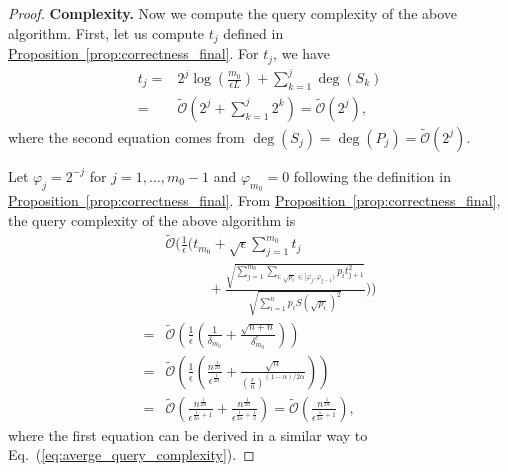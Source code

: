 \documentclass[journal]{IEEEtran}
\newcommand{\eq}[1]{Eq.~(\ref{eq:#1})}
\newcommand{\prop}[1]{\hyperref[prop:#1]{Proposition~\ref*{prop:#1}}}
\begin{document}
\begin{proof}
    \vspace{3mm}
    \noindent
    \textbf{Complexity.}
    Now we compute the query complexity of the above algorithm. 
    First, let us compute $t_j$ defined in \prop{correctness_final}. For $t_j$, we have
    \begin{align}
        t_j = & 2^j\log(\frac{m_0}{\epsilon L}) + \sum_{k = 1}^{j}\deg(S_k) \nonumber \\
        = & \widetilde{\mathcal{O}}\left(2^j + \sum_{k = 1}^{j} 2^k\right)= \widetilde{\mathcal{O}}\left(2^j\right),
    \end{align}
    where the second equation comes from $\deg(S_j) =
    \deg(P_j) = \widetilde{\mathcal{O}}\left(2^j\right)$. 

    Let $\varphi_j = 2^{-j}$ for $j = 1,\ldots,m_0-1$ and $\varphi_{m_0}=0$ following the definition in \prop{correctness_final}.
    From \prop{correctness_final}, the query complexity of the above algorithm is 
    \begin{align}
    &\widetilde{\mathcal{O}}\biggl(\frac{1}{\epsilon}\biggl(t_{m_0} + \sqrt{\epsilon} \sum_{j=1}^{m_0} t_j \nonumber \\ 
    & \qquad \quad+ \frac{\sqrt{\sum_{j = 1}^{m_0}\sum_{i:\sqrt{p_i}\in[\varphi_{j},\varphi_{j-1})}p_i t_{j+1}^2}}{\sqrt{\sum_{i = 1}^np_iS(\sqrt{p_i})^2}}\biggr)\biggr) \nonumber\\
    =&\widetilde{\mathcal{O}}\left(\frac{1}{\epsilon}\left(\frac{1}{\delta_{m_0}} + \frac{\sqrt{n + n}}{\delta_{m_0}^{c}}\right)\right) \nonumber\\
    =&\widetilde{\mathcal{O}}\left(\frac{1}{\epsilon}\left(\frac{n^{\frac{1}{2\alpha}}}{\epsilon^{\frac{1}{2\alpha}}} + \frac{\sqrt{n}}{\left(\frac{\epsilon}{n}\right)^{(1-\alpha)/2\alpha}}\right)\right) \nonumber\\
    =&\widetilde{\mathcal{O}}\left(\frac{n^{\frac{1}{2\alpha}}}{\epsilon^{\frac{1}{2\alpha} + 1}}+\frac{n^{\frac{1}{2\alpha}}}{\epsilon^{\frac{1}{2\alpha}+\frac{1}{2}}}\right) 
    = \widetilde{\mathcal{O}}\left(\frac{n^{\frac{1}{2\alpha}}}{\epsilon^{\frac{1}{2\alpha}+1}}\right), 
\end{align}
where the first equation can be derived in a similar way to \eq{averge_query_complexity}.
\end{proof}
\end{document}

